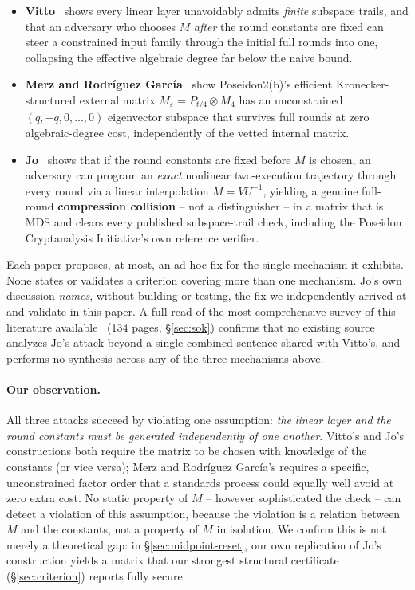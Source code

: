 \documentclass[conference]{IEEEtran}
\theoremstyle{definition}
\theoremstyle{plain}
\begin{document}
\begin{itemize}[leftmargin=1.2em]
  \item \textbf{Vitto}~\cite{slipway2026} shows every linear layer
  unavoidably admits \emph{finite} subspace trails, and that an
  adversary who chooses $M$ \emph{after} the round constants are fixed
  can steer a constrained input family through the initial full rounds
  into one, collapsing the effective algebraic degree far below the
  naive bound.
  \item \textbf{Merz and Rodr\'iguez Garc\'ia}~\cite{cryptoeprint:2026/306}
  show Poseidon2(b)'s efficient Kronecker-structured external matrix
  $M_\varepsilon=P_{t/4}\otimes M_4$ has an unconstrained
  $(q,-q,0,\ldots,0)$ eigenvector subspace that survives full rounds at
  zero algebraic-degree cost, independently of the vetted internal
  matrix.
  \item \textbf{Jo}~\cite{jo2026} shows that if the round constants are
  fixed before $M$ is chosen, an adversary can program an \emph{exact}
  nonlinear two-execution trajectory through every round via a linear
  interpolation $M=VU^{-1}$, yielding a genuine full-round
  \textbf{compression collision} -- not a distinguisher -- in a matrix
  that is MDS and clears every published subspace-trail check,
  including the Poseidon Cryptanalysis Initiative's own reference
  verifier.
\end{itemize}

Each paper proposes, at most, an ad hoc fix for the single mechanism it
exhibits. None states or validates a criterion covering more than one
mechanism. Jo's own discussion \emph{names}, without building or
testing, the fix we independently arrived at and validate in this paper.
A full read of the most comprehensive survey of this literature
available~\cite{sok2026} (134 pages, \S\ref{sec:sok}) confirms that no
existing source analyzes Jo's attack beyond a single combined sentence
shared with Vitto's, and performs no synthesis across any of the three
mechanisms above.

\paragraph{Our observation.} All three attacks succeed by violating one
assumption: \emph{the linear layer and the round constants must be
generated independently of one another}. Vitto's and Jo's constructions
both require the matrix to be chosen with knowledge of the constants (or
vice versa); Merz and Rodr\'iguez Garc\'ia's requires a specific,
unconstrained factor order that a standards process could equally well
avoid at zero extra cost. No static property of $M$ -- however
sophisticated the check -- can detect a violation of this assumption,
because the violation is a relation between $M$ and the constants, not a
property of $M$ in isolation. We confirm this is not merely a
theoretical gap: in \S\ref{sec:midpoint-reset}, our own replication of
Jo's construction yields a matrix that our strongest structural
certificate (\S\ref{sec:criterion}) reports fully secure.
\end{document}

